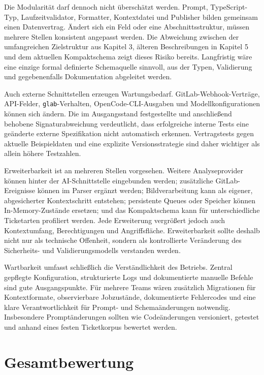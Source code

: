 Die Modularität darf dennoch nicht überschätzt werden. Prompt, TypeScript-Typ, Laufzeitvalidator, Formatter, Kontextdatei und Publisher bilden gemeinsam einen Datenvertrag. Ändert sich ein Feld oder eine Abschnittsstruktur, müssen mehrere Stellen konsistent angepasst werden. Die Abweichung zwischen der umfangreichen Zielstruktur aus Kapitel 3, älteren Beschreibungen in Kapitel 5 und dem aktuellen Kompaktschema zeigt dieses Risiko bereits. Langfristig wäre eine einzige formal definierte Schemaquelle sinnvoll, aus der Typen, Validierung und gegebenenfalls Dokumentation abgeleitet werden.

Auch externe Schnittstellen erzeugen Wartungsbedarf. GitLab-Webhook-Verträge, API-Felder, \texttt{glab}-Verhalten, OpenCode-CLI-Ausgaben und Modellkonfigurationen können sich ändern. Die im Ausgangsstand festgestellte und anschließend behobene Signaturabweichung verdeutlicht, dass erfolgreiche interne Tests eine geänderte externe Spezifikation nicht automatisch erkennen. Vertragstests gegen aktuelle Beispieldaten und eine explizite Versionsstrategie sind daher wichtiger als allein höhere Testzahlen.

Erweiterbarkeit ist an mehreren Stellen vorgesehen. Weitere Analyseprovider können hinter der AI-Schnittstelle eingebunden werden; zusätzliche GitLab-Ereignisse können im Parser ergänzt werden; Bildverarbeitung kann als eigener, abgesicherter Kontextschritt entstehen; persistente Queues oder Speicher können In-Memory-Zustände ersetzen; und das Kompaktschema kann für unterschiedliche Ticketarten profiliert werden. Jede Erweiterung vergrößert jedoch auch Kontextumfang, Berechtigungen und Angriffsfläche. Erweiterbarkeit sollte deshalb nicht nur als technische Offenheit, sondern als kontrollierte Veränderung des Sicherheits- und Validierungsmodells verstanden werden.

Wartbarkeit umfasst schließlich die Verständlichkeit des Betriebs. Zentral gepflegte Konfiguration, strukturierte Logs und dokumentierte manuelle Befehle sind gute Ausgangspunkte. Für mehrere Teams wären zusätzlich Migrationen für Kontextformate, observierbare Jobzustände, dokumentierte Fehlercodes und eine klare Verantwortlichkeit für Prompt- und Schemaänderungen notwendig. Insbesondere Promptänderungen sollten wie Codeänderungen versioniert, getestet und anhand eines festen Ticketkorpus bewertet werden.

\section{Gesamtbewertung}

